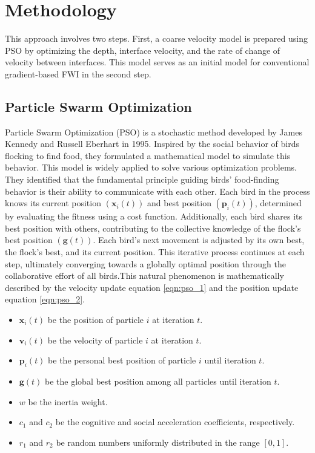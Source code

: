 \documentclass[paper,revised]{geophysics}
\begin{document}
\section{Methodology}
This approach involves two steps. First, a coarse velocity model is prepared using PSO by optimizing the depth, interface velocity, and the rate of change of velocity between interfaces. This model serves as an initial model for conventional gradient-based FWI in the second step.
\subsection{Particle Swarm Optimization}
Particle Swarm Optimization (PSO) is a stochastic method developed by James Kennedy and Russell Eberhart in 1995. Inspired by the social behavior of birds flocking to find food, they formulated a mathematical model to simulate this behavior. This model is widely applied to solve various optimization problems. They identified that the fundamental principle guiding birds' food-finding behavior is their ability to communicate with each other. Each bird in the process knows its current position \((\mathbf{x}_i(t))\) and best position \((\mathbf{p}_i(t))\), determined by evaluating the fitness using a cost function. Additionally, each bird shares its best position with others, contributing to the collective knowledge of the flock's best position \((\mathbf{g}(t))\). Each bird's next movement is adjusted by its own best, the flock's best, and its current position. This iterative process continues at each step, ultimately converging towards a globally optimal position through the collaborative effort of all birds.This natural phenomenon is mathematically described by the velocity update equation \ref{eqn:pso_1} and the position update equation \ref{eqn:pso_2}.
\begin{itemize}
	\item \( \mathbf{x}_i(t) \) be the position of particle \( i \) at iteration \( t \).
	\item \( \mathbf{v}_i(t) \) be the velocity of particle \( i \) at iteration \( t \).
	\item \( \mathbf{p}_i(t) \) be the personal best position of particle \( i \) until iteration \( t \).
	\item \( \mathbf{g}(t) \) be the global best position among all particles until iteration \( t \).
	\item \( w \) be the inertia weight.
	\item \( c_1 \) and \( c_2 \) be the cognitive and social acceleration coefficients, respectively.
	\item \( r_1 \) and \( r_2 \) be random numbers uniformly distributed in the range \([0, 1]\).
\end{itemize}
\end{document}

